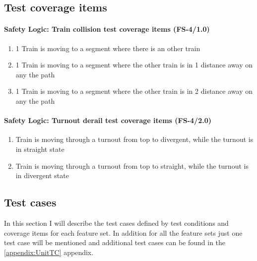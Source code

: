 \subsection{Test coverage items}
\paragraph{Safety Logic: Train collision test coverage items (FS-4/1.0)}
\begin{enumerate}[label=FS-5/1.0-\arabic*, leftmargin=*, format=\small]
	\item 1 Train is moving to a segment where there is an other train
	\item 1 Train is moving to a segment where the other train is in 1 distance away on any the path
	\item 1 Train is moving to a segment where the other train is in 2 distance away on any the path
\end{enumerate}
\paragraph{Safety Logic: Turnout derail test coverage items (FS-4/2.0)}
\begin{enumerate}[label=FS-5/2.0-\arabic*, leftmargin=*, format=\small]
	\item Train is moving through a turnout from top to divergent, while the turnout is in straight state
	\item Train is moving through a turnout from top to straight, while the turnout is in divergent state
\end{enumerate}

\subsection{Test cases}\label{section:UnitTestCases}
In this section I will describe the test cases defined by test conditions and coverage items for each feature set. In addition for all the feature sets just one test case will be mentioned and additional test cases can be found in the \ref{appendix:UnitTC} appendix.
